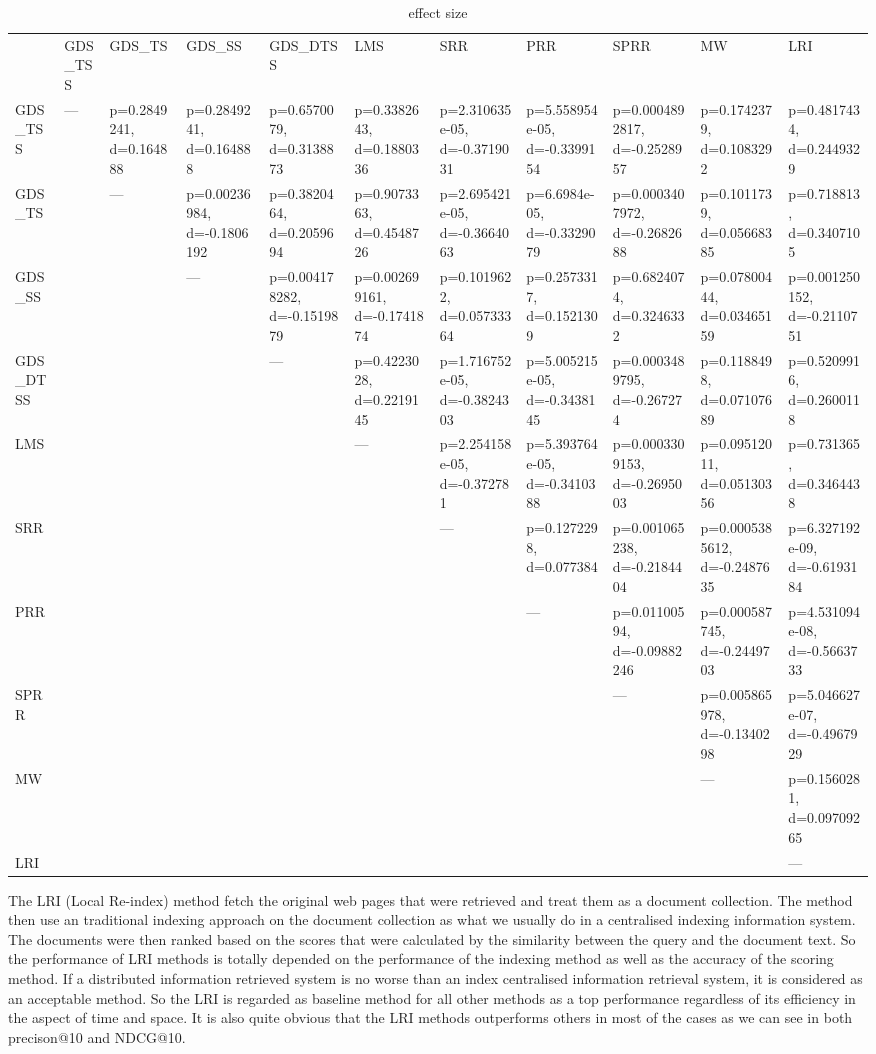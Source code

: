 \begin{table}
\tiny
\begin{tabular}{p{1.2cm}p{1.2cm}p{1.2cm}p{1.2cm}p{1.2cm}p{1.2cm}p{1.2cm}p{1.2cm}p{1.2cm}p{1.2cm}p{1.2cm}}
&GDS\_TSS&GDS\_TS&GDS\_SS&GDS\_DTSS&LMS&SRR&PRR&SPRR&MW&LRI\\
\cmidrule(lr){2-11}
GDS\_TSS&---&p=0.2849241, d=0.164888&p=0.2849241, d=0.164888&p=0.6570079, d=0.3138873&p=0.3382643, d=0.1880336&p=2.310635e-05, d=-0.3719031& p=5.558954e-05, d=-0.3399154&p=0.0004892817, d=-0.2528957&p=0.1742379, d=0.1083292&p=0.4817434, d=0.2449329\\
GDS\_TS&&---&p=0.00236984, d=-0.1806192&p=0.3820464, d=0.2059694&p=0.9073363, d=0.4548726&p=2.695421e-05, d=-0.3664063&p=6.6984e-05, d=-0.3329079&p=0.0003407972, d=-0.2682688&p=0.1011739, d=0.05668385&p=0.718813, d=0.3407105\\
GDS\_SS&&&---&p=0.004178282, d=-0.1519879&p=0.002699161, d=-0.1741874&p=0.1019622, d=0.05733364&p=0.2573317, d=0.1521309&p=0.6824074, d=0.3246332&p=0.07800444, d=0.03465159&p=0.001250152, d=-0.2110751\\
GDS\_DTSS&&&&---&p=0.4223028, d=0.2219145&p=1.716752e-05, d=-0.3824303&p=5.005215e-05, d=-0.3438145&p=0.0003489795, d=-0.267274&p=0.1188498, d=0.07107689&p=0.5209916, d=0.2600118\\
LMS&&&&&---&p=2.254158e-05, d=-0.372781&p=5.393764e-05, d=-0.3410388&p=0.0003309153, d=-0.2695003&p=0.09512011, d=0.05130356&p=0.731365, d=0.3464438\\
SRR&&&&&&---&p=0.1272298, d=0.077384&p=0.001065238, d=-0.2184404&p=0.0005385612, d=-0.2487635&p=6.327192e-09, d=-0.6193184\\
PRR&&&&&&&---&p=0.01100594, d=-0.09882246&p=0.000587745, d=-0.2449703&p=4.531094e-08, d=-0.5663733\\
SPRR&&&&&&&&---&p=0.005865978, d=-0.1340298&p=5.046627e-07, d=-0.4967929\\
MW&&&&&&&&&---&p=0.1560281, d=0.09709265\\
LRI&&&&&&&&&&---\\
\end{tabular}
\caption{effect size}
\label{tb:effect size}
\end{table}

The LRI (Local Re-index) method fetch the original web pages that were retrieved and  treat them as a document collection. The method then use an traditional indexing approach on the document collection as what we usually do in a centralised indexing information system. The documents were then ranked based on the scores that were calculated by the similarity between the query and the document text. So the performance of LRI methods is totally depended on the performance of the indexing method as well as the accuracy of the scoring method. If a distributed information retrieved system is no worse than an index centralised information retrieval system, it is considered as an acceptable method.	So the LRI is regarded as baseline method for all other methods as a top performance regardless of its efficiency in the aspect of time and space. It is also quite obvious that the LRI methods outperforms others in most of the cases as we can see in both precison@10 and NDCG@10.

